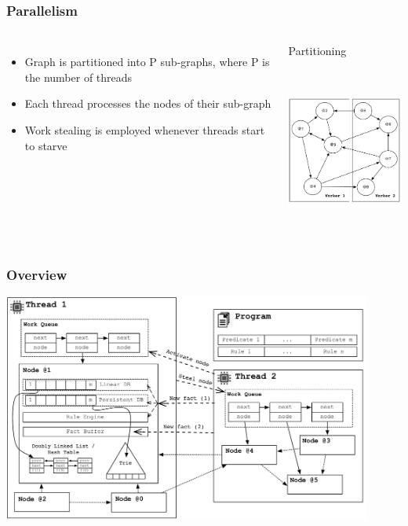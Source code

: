 \documentclass{beamer}
\begin{document}
\begin{frame}[fragile]
   \frametitle{Parallelism}
  \begin{columns}[t]
{\small
      \begin{itemize}
      \item Graph is partitioned into P sub-graphs, where P is the number of threads
      \item Each thread processes the nodes of their sub-graph
      \item Work stealing is employed whenever threads start to starve
      \end{itemize}
}
       \begin{block}{Partitioning}
       \begin{center}
          \includegraphics[height=5.5cm]{graph_coordination.pdf}
          \end{center}
       \end{block}
   \end{columns}
\end{frame}

\begin{frame}[fragile]
   \frametitle{Overview}
   \includegraphics[height=7.5cm]{overview.pdf}
\end{frame}
\end{document}

